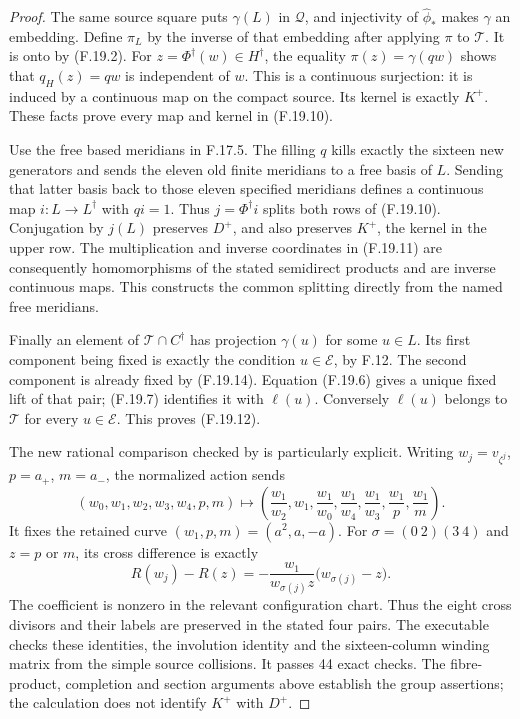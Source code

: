 \begin{proof}
The same source square puts \(\gamma(L)\) in
\(\mathcal Q\), and injectivity of
\(\widehat\phi_*\) makes \(\gamma\) an embedding.
Define \(\pi_L\) by the inverse of that embedding
after applying \(\pi\) to \(\mathcal T\).
It is onto by (F.19.2).
For \(z=\Phi^\dagger(w)\in H^\dagger\), the equality
\(\pi(z)=\gamma(qw)\) shows that \(q_H(z)=qw\)
is independent of \(w\).
This is a continuous surjection: it is induced
by a continuous map on the compact source.
Its kernel is exactly \(K^+\).
These facts prove every map and kernel in
(F.19.10).

Use the free based meridians in F.17.5.
The filling \(q\) kills exactly the sixteen new
generators and sends the eleven old finite
meridians to a free basis of \(L\).
Sending that latter basis back to those eleven
specified meridians defines a continuous map
\(i:L\to L^\dagger\) with \(qi=1\).
Thus \(j=\Phi^\dagger i\) splits both rows of
(F.19.10).
Conjugation by \(j(L)\) preserves \(D^+\), and
also preserves \(K^+\), the kernel in the upper
row.  The multiplication and inverse coordinates
in (F.19.11) are consequently homomorphisms
of the stated semidirect products and are
inverse continuous maps.
This constructs the common splitting directly
from the named free meridians.

Finally an element of \(\mathcal T\cap C^\dagger\)
has projection \(\gamma(u)\) for some \(u\in L\).
Its first component being fixed is exactly the
condition \(u\in\mathcal E\), by F.12.
The second component is already fixed by
(F.19.14).
Equation (F.19.6) gives a unique fixed lift of
that pair; (F.19.7) identifies it with \(\ell(u)\).
Conversely \(\ell(u)\) belongs to \(\mathcal T\)
for every \(u\in\mathcal E\).
This proves (F.19.12).

The new rational comparison checked by
is particularly explicit.
Writing \(w_j=v_{\zeta^j}\), \(p=a_+\), \(m=a_-\),
the normalized action sends
\[
 (w_0,w_1,w_2,w_3,w_4,p,m)\longmapsto
 \left(\frac{w_1}{w_2},w_1,\frac{w_1}{w_0},
       \frac{w_1}{w_4},\frac{w_1}{w_3},
       \frac{w_1}{p},\frac{w_1}{m}\right).
                                                               \tag{F.19.20}
\]
It fixes the retained curve
\((w_1,p,m)=(a^2,a,-a)\).
For \(\sigma=(0\ 2)(3\ 4)\) and \(z=p\) or \(m\),
its cross difference is exactly
\[
 R(w_j)-R(z)
       =-\frac{w_1}{w_{\sigma(j)}z}
                      \bigl(w_{\sigma(j)}-z\bigr).
                                                               \tag{F.19.21}
\]
The coefficient is nonzero in the relevant
configuration chart.  Thus the eight cross
divisors and their labels are preserved in
the stated four pairs.
The executable checks these identities, the
involution identity and the sixteen-column
winding matrix from the simple source collisions.
It passes 44 exact checks.
The fibre-product, completion and section arguments
above establish the group assertions; the calculation
does not identify \(K^+\) with \(D^+\).
\end{proof}
